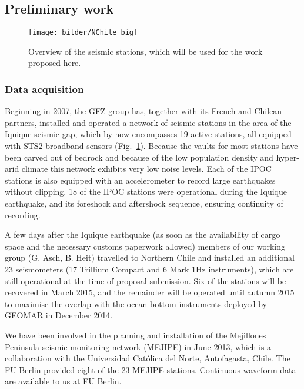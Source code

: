 \documentclass[11pt]{article}
\newcommand{\note}[1]{{\it \color{red} #1}}
\newcommand{\noteft}[1]{{\it \color{magenta} FT:#1}}
\newcommand{\note}[1]{}
\newcommand{\noteft}[1]{}
\begin{document}
\subsection{Preliminary work}

\begin{figure}
\texttt{[image: bilder/NChile\_big]}
\caption{\footnotesize Overview of the seismic stations, which will be used for the work proposed here.}
\label{fig:map}
\end{figure}

\subsubsection{Data acquisition}
\label{sec:ipoc}

Beginning in 2007, the GFZ group has, together with its French and Chilean partners, installed and operated a network of seismic stations in the area of the Iquique seismic gap, which by now encompasses 19 active stations, all equipped with STS2 broadband sensors (Fig.~\ref{fig:map}). Because the vaults for most stations have been carved out of bedrock and because of the low population density and hyper-arid climate this network exhibits very low noise levels. Each of the IPOC stations is also equipped with an accelerometer to record large earthquakes without clipping.
18 of the IPOC stations were operational during the Iquique earthquake, and its foreshock and aftershock sequence, ensuring continuity of recording.

A few days after the Iquique earthquake (as soon as the availability of cargo space and the necessary customs paperwork allowed) members of our working group (G. Asch, B. Heit) travelled to Northern Chile and installed an additional 23 seismometers (17 Trillium Compact and 6 Mark 1Hz instruments), which are still operational at the time of proposal submission. Six of the stations will be recovered in March 2015, and the remainder will be operated until autumn 2015 to maximise the overlap with the ocean bottom instruments deployed by GEOMAR in December 2014.

We have  been involved in the planning and installation of the Mejillones Peninsula seismic monitoring network (MEJIPE) in June 2013, which is a collaboration with the Universidad Cat\'olica del Norte, Antofagasta, Chile. The FU Berlin provided eight of the 23 MEJIPE stations.
Continuous waveform data are available to us at FU Berlin.\\[0.2cm] 
\end{document}
